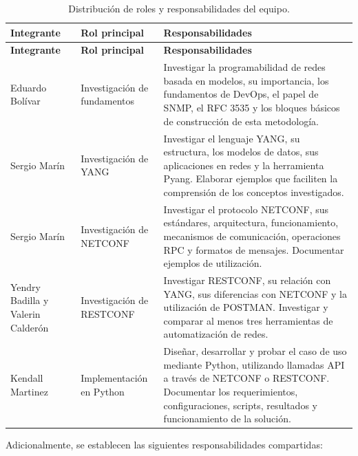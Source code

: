 \documentclass[12pt,a4paper]{article}
\begin{document}
\begin{longtable}{>{\centering\arraybackslash}p{2.2cm}
                  >{\centering\arraybackslash}p{2.8cm}
                  p{9cm}}
\caption{Distribución de roles y responsabilidades del equipo.}\\
\toprule
\textbf{Integrante} & \textbf{Rol principal} & \textbf{Responsabilidades} \\
\midrule
\endfirsthead

\toprule
\textbf{Integrante} & \textbf{Rol principal} & \textbf{Responsabilidades} \\
\midrule
\endhead

Eduardo Bolívar &
Investigación de fundamentos &
Investigar la programabilidad de redes basada en modelos, su importancia, los fundamentos de DevOps, el papel de SNMP, el RFC 3535 y los bloques básicos de construcción de esta metodología. \\

\midrule

Sergio Marín &
Investigación de YANG &
Investigar el lenguaje YANG, su estructura, los modelos de datos, sus aplicaciones en redes y la herramienta Pyang. Elaborar ejemplos que faciliten la comprensión de los conceptos investigados. \\

\midrule

Sergio Marín &
Investigación de NETCONF &
Investigar el protocolo NETCONF, sus estándares, arquitectura, funcionamiento, mecanismos de comunicación, operaciones RPC y formatos de mensajes. Documentar ejemplos de utilización. \\

\midrule

Yendry Badilla y Valerin Calderón &
Investigación de RESTCONF &
Investigar RESTCONF, su relación con YANG, sus diferencias con NETCONF y la utilización de POSTMAN. Investigar y comparar al menos tres herramientas de automatización de redes. \\

\midrule

Kendall Martinez &
Implementación en Python &
Diseñar, desarrollar y probar el caso de uso mediante Python, utilizando llamadas API a través de NETCONF o RESTCONF. Documentar los requerimientos, configuraciones, scripts, resultados y funcionamiento de la solución. \\

\bottomrule
\end{longtable}

Adicionalmente, se establecen las siguientes responsabilidades compartidas:
\end{document}
